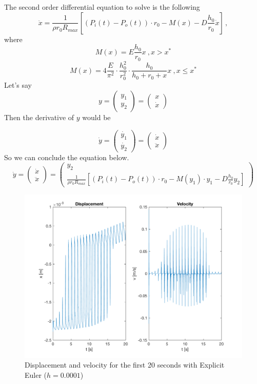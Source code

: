 \documentclass[12pt]{report}
\begin{document}
The second order differential equation to solve is the following
$$\ddot{x}=\frac{1}{\rho r_0 R_{max}}\left [(P_i(t)-P_o(t))\cdot r_0-M(x)-D\frac{h_0}{r_0}\dot{x}\right ]\,,$$
where
$$M(x)=E\frac{h_0}{r_0}x \ , x>x^*$$
$$M(x)=4 \frac{E}{\pi^2}\cdot\frac{h_0^2}{r_0^2}\cdot\frac{h_0}{h_0+r_0+x}x \ , x\leq x^*$$
Let's say
\begin{equation}
y=\begin{pmatrix}y_1\\y_2\end{pmatrix}=\begin{pmatrix}x\\\dot{x}\end{pmatrix}
\label{eq:1}
\end{equation}
Then the derivative of $y$ would be

\begin{equation}
\dot{y}=\begin{pmatrix}\dot{y_1}\\\dot{y_2}\end{pmatrix}=\begin{pmatrix}\dot{x}\\\ddot{x}\end{pmatrix}
\label{eq:2}
\end{equation} 
So we can conclude the equation below.
\begin{equation} \dot{y}=\begin{pmatrix}\dot{x}\\\ddot{x}\end{pmatrix}=\begin{pmatrix}y_2\\\frac{1}{\rho r_0 R_{max}}\left [(P_i(t)-P_o(t))\cdot r_0-M(y_1)\cdot y_1-D\frac{h_0}{r_0}y_2\right ]\end{pmatrix}
\label{eq:3}
\end{equation} 

\begin{figure}[h]
	\centering
	\includegraphics[width=15cm]{Pics/DispVeloEuler.png}
	\caption{Displacement and velocity for the first 20 seconds with Explicit Euler ($h = 0.0001$)}
	\label{fig:1}
\end{figure}
\end{document}
